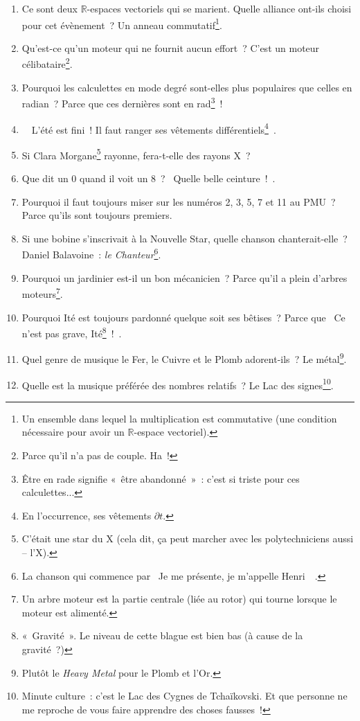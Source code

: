 \documentclass[10pt,a5paper,fullpage]{book}
\begin{document}
\begin{enumerate}
		\item Ce sont deux $\mathbb{R}$-espaces vectoriels qui se marient. Quelle alliance ont-ils choisi pour cet évènement~? Un anneau commutatif\footnote{Un ensemble dans lequel la multiplication est commutative (une condition nécessaire pour avoir un $\mathbb{R}$-espace vectoriel).}. 
		\item Qu’est-ce qu’un moteur qui ne fournit aucun effort~? C’est un moteur célibataire\footnote{Parce qu'il n'a pas de couple. Ha~!}.
		\item Pourquoi les calculettes en mode degré sont-elles plus populaires que celles en radian~? Parce que ces dernières sont en rad\footnote{Être en rade signifie « être abandonné »~: c’est si triste pour ces calculettes...}~!
		\item \guillemotleft~ L'été est fini~! Il faut ranger ses vêtements différentiels\footnote{En l'occurrence, ses vêtements $\partial t$.}~\guillemotright.
		\item Si Clara Morgane\footnote{C’était une star du X (cela dit, ça peut marcher avec les polytechniciens aussi -- l’X).} rayonne, fera-t-elle des rayons X~?
		\item Que dit un 0 quand il voit un 8~? \guillemotleft~Quelle belle ceinture~!~\guillemotright.
		\item Pourquoi il faut toujours miser sur les numéros 2, 3, 5, 7 et 11 au PMU~? Parce qu’ils sont toujours premiers.
		\item Si une bobine s'inscrivait à la Nouvelle Star, quelle chanson chanterait-elle~? Daniel Balavoine~: \textit{le Chanteur}\footnote{La chanson qui commence par \guillemotleft~Je me présente, je m'appelle Henri \textmusicalnote~\guillemotright.}.
		\item Pourquoi un jardinier est-il un bon mécanicien~? Parce qu’il a plein d’arbres moteurs\footnote{Un arbre moteur est la partie centrale (liée au rotor) qui tourne lorsque le moteur est alimenté.}.
		\item Pourquoi Ité est toujours pardonné quelque soit ses bêtises~? Parce que \guillemotleft~Ce n’est pas grave, Ité\footnote{« Gravité ». Le niveau de cette blague est bien bas (à cause de la gravité~?)}~!~\guillemotright.
		\item Quel genre de musique le Fer, le Cuivre et le Plomb adorent-ils~? Le métal\footnote{Plutôt le \textit{Heavy Metal} pour le Plomb et l’Or.}.
		\item Quelle est la musique préférée des nombres relatifs~? Le Lac des signes\footnote{Minute culture~: c’est le Lac des Cygnes de Tchaïkovski. Et que personne ne me reproche de vous faire apprendre des choses fausses~!}.

\end{enumerate}
\end{document}
